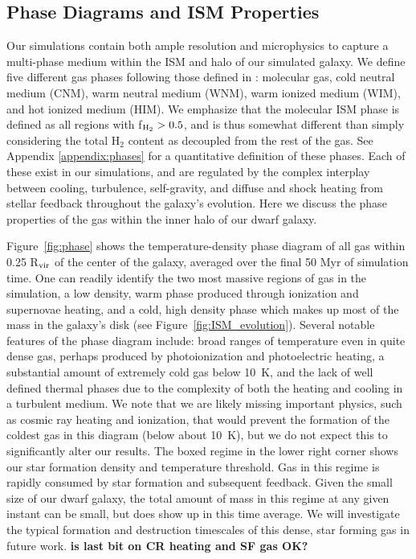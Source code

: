 \documentclass[twocolumn]{aastex61}
\begin{document}
\subsection{Phase Diagrams and ISM Properties}
\label{sec:phase}

Our simulations contain both ample resolution and microphysics to capture a multi-phase medium within the ISM and halo of our simulated galaxy. We define five different gas phases following those defined in \citep{Draine2011}: molecular gas, cold neutral medium (CNM), warm neutral medium (WNM), warm ionized medium (WIM), and hot ionized medium (HIM). We emphasize that the molecular ISM phase is defined as all regions with f$_{\rm H_2} > 0.5$, and is thus somewhat different than simply considering the total H$_2$ content as decoupled from the rest of the gas. See Appendix \ref{appendix:phases} for a quantitative definition of these phases. Each of these exist in our simulations, and are regulated by the complex interplay between cooling, turbulence, self-gravity, and diffuse and shock heating from stellar feedback throughout the galaxy's evolution. Here we discuss the phase properties of the gas within the inner halo of our dwarf galaxy.

Figure~\ref{fig:phase} shows the temperature-density phase diagram of all gas within 0.25 R$_{\rm vir}$ of the center of the galaxy, averaged over the final 50 Myr of simulation time. One can readily identify the two most massive regions of gas in the simulation, a low density, warm phase produced through ionization and supernovae heating, and a cold, high density phase which makes up most of the mass in the galaxy's disk (see Figure~\ref{fig:ISM_evolution}). Several notable features of the phase diagram include: broad ranges of temperature even in quite dense gas, perhaps produced by photoionization and photoelectric heating, a substantial amount of extremely cold gas below 10~K, and the lack of well defined thermal phases due to the complexity of both the heating and cooling in a turbulent medium. We note that we are likely missing important physics, such as cosmic ray heating and ionization, that would prevent the formation of the coldest gas in this diagram (below about 10~K), but we do not expect this to significantly alter our results. The boxed regime in the lower right corner shows our star formation density and temperature threshold. Gas in this regime is rapidly consumed by star formation and subsequent feedback. Given the small size of our dwarf galaxy, the total amount of mass in this regime at any given instant can be small, but does show up in this time average. We will investigate the typical formation and destruction timescales of this dense, star forming gas in future work. \textbf{is last bit on CR heating and SF gas OK?}
\end{document}
